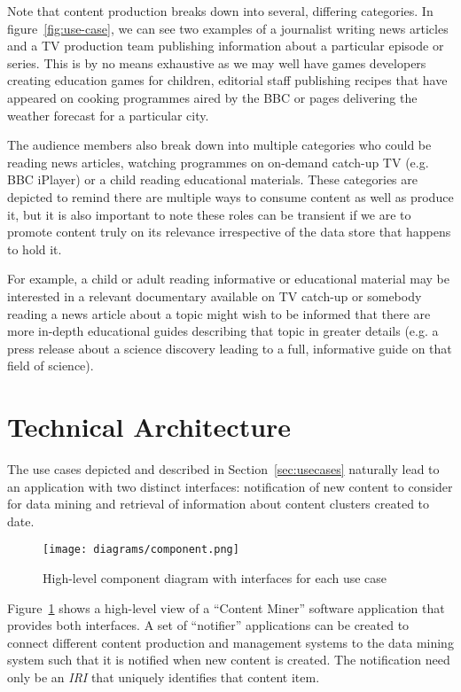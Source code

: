 Note that content production breaks down into several, differing
categories. In figure~\ref{fig:use-case}, we can see two examples of
a journalist writing news articles and a TV production team
publishing information about a particular episode or series. This is
by no means exhaustive as we may well have games developers creating
education games for children, editorial staff publishing recipes that
have appeared on cooking programmes aired by the BBC or pages
delivering the weather forecast for a particular city.

The audience members also break down into multiple categories who
could be reading news articles, watching programmes on on-demand
catch-up TV (e.g. BBC iPlayer) or a child reading educational materials.
These categories are depicted to remind there are multiple ways to
consume content as well as produce it, but it is also important to
note these roles can be transient if we are to promote content truly
on its relevance irrespective of the data store that happens to hold
it.

For example, a child or adult reading informative or educational
material may be interested in a relevant documentary available on
TV catch-up or somebody reading a news article about a topic might
wish to be informed that there are more in-depth educational guides
describing that topic in greater details (e.g. a press release about
a science discovery leading to a full, informative guide on that
field of science).

\section{Technical Architecture}

The use cases depicted and described in Section~\ref{sec:usecases} naturally
lead to an application with two distinct interfaces: notification of new
content to consider for data mining and retrieval of information about content
clusters created to date.

\begin{figure}[h]
  \begin{center}
    \texttt{[image: diagrams/component.png]}
  \end{center}
  \caption{High-level component diagram with interfaces for each use case\label{fig:component}}
\end{figure}

Figure~\ref{fig:component} shows a high-level view of a ``Content Miner''
software application that provides both interfaces. A set of ``notifier''
applications can be created to connect different content production and
management systems to the data mining system such that it is notified when new
content is created. The notification need only be an \emph{IRI} that uniquely
identifies that content item.

